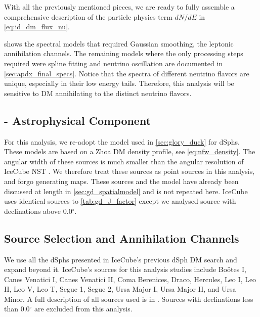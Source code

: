 With all the previously mentioned pieces, we are ready to fully assemble a comprehensive description of the particle physics term $dN/dE$ in \cref{eq:id_dm_flux_nu}.
\nuIDDMFlux

 shows the spectral models that required Gaussian smoothing, the leptonic annihilation channels.
The remaining models where the only processing steps required were spline fitting and neutrino oscillation are documented in \cref{sec:apdx_final_specs}.
Notice that the spectra of different neutrino flavors are unique, especially in their low energy tails.
Therefore, this analysis will be sensitive to DM annihilating to the distinct neutrino flavors.

\subsection{\J - Astrophysical Component}\label{sec:icDM_spatialmodel}

For this analysis, we re-adopt the \GS model \cite{Geringer_Sameth_2015} used in \cref{sec:glory_duck} for dSphs.
These models are based on a Zhoa DM density profile, see \cref{eq:nfw_density}.
The angular width of these sources is much smaller than the angular resolution of IceCube NST \cite{IC_NGC1068}.
We therefore treat these sources as point sources in this analysis, and forgo generating maps.
These sources and the \GS model have already been discussed at length in \cref{sec:gd_spatialmodel} and is not repeated here.
IceCube uses identical sources to \cref{tab:gd_J_factor} except we analysed source with declinations above 0.0$^\circ$.

\subsection{Source Selection and Annihilation Channels}\label{sec:ic3_study_selection}

We use all the dSphs presented in IceCube's previous dSph DM search \cite{IC3_DM2013} and expand beyond it.
IceCube's sources for this analysis studies include Boötes I, Canes Venatici I, Canes Venatici II, Coma Berenices, Draco, Hercules, Leo I, Leo II, Leo V, Leo T, Segue 1, Segue 2, Ursa Major I, Ursa Major II,  and Ursa Minor.
A full description of all sources used is in .
Sources with declinations less than 0.0$^\circ$ are excluded from this analysis.

